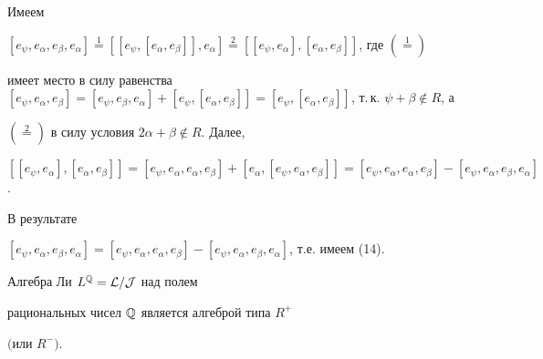 \begin{pf}


Имеем


$[e_\psi,e_\alpha,e_\beta,e_\alpha]\overset{1}{=}{}


[[e_\psi,[e_\alpha,e_\beta]],e_\alpha]\overset{2}{=}{}


[[e_\psi,e_\alpha],[e_\alpha,e_\beta]]$, где $(\stackrel{1}{=})$


имеет место в силу равенства $[e_\psi,e_\alpha,e_\beta]=


[e_\psi,e_\beta,e_\alpha]+[e_\psi,[e_\alpha,e_\beta]]=


[e_\psi,[e_\alpha,e_\beta]]$, т.\,к. $\psi+\beta\notin R$, а


$(\overset{2}{=})$ в силу условия $2\alpha+\beta\notin R$. Далее,


$[[e_\psi,e_\alpha],[e_\alpha,e_\beta]]=


[e_\psi,e_\alpha,e_\alpha,e_\beta]+[e_\alpha,[e_\psi,e_\alpha,e_\beta]]


=[e_\psi,e_\alpha,e_\alpha,e_\beta]-[e_\psi,e_\alpha,e_\beta,e_\alpha]$.


В результате 


$[e_\psi,e_\alpha,e_\beta,e_\alpha]=[e_\psi,e_\alpha,e_\alpha,e_\beta]


-[e_\psi,e_\alpha,e_\beta,e_\alpha]$, т.е. имеем (14).


\end{pf}





\begin{lem}


Алгебра Ли $L^{\Bbb Q}=\cal L/J$ над полем


рациональных чисел $\Bbb Q$ является алгеброй типа $R^+$


$($или $R^-)$.


\end{lem}





